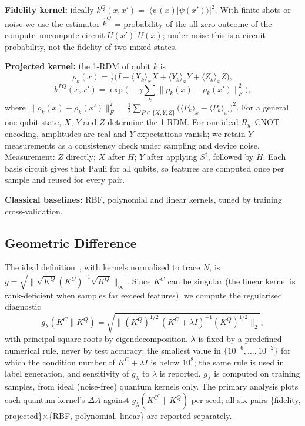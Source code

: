 \documentclass[conference]{IEEEtran}
\begin{document}
\textbf{Fidelity kernel:} ideally $k^{Q}(x,x') = |\langle \psi(x)|\psi(x')\rangle|^{2}$. With finite shots or noise we use the estimator $\hat k^{Q}$ = probability of the all-zero outcome of the compute--uncompute circuit $U(x')^\dagger U(x)$; under noise this is a circuit probability, not the fidelity of two mixed states.

\textbf{Projected kernel:} the 1-RDM of qubit $k$ is
\begin{equation}
\rho_k(x)=\tfrac{1}{2}\big(I+\langle X_k\rangle_x X+\langle Y_k\rangle_x Y+\langle Z_k\rangle_x Z\big),
\end{equation}
\begin{equation}
k^{PQ}(x,x') = \exp\!\Big(-\gamma \sum_{k}\big\|\rho_k(x)-\rho_k(x')\big\|_F^{2}\Big),
\end{equation}
where $\|\rho_k(x)-\rho_k(x')\|_F^2=\tfrac{1}{2}\sum_{P\in\{X,Y,Z\}}\big(\langle P_k\rangle_x-\langle P_k\rangle_{x'}\big)^2$. For a general one-qubit state, $X$, $Y$ and $Z$ determine the 1-RDM. For our ideal $R_y$--CNOT encoding, amplitudes are real and $Y$ expectations vanish; we retain $Y$ measurements as a consistency check under sampling and device noise. Measurement: $Z$ directly; $X$ after $H$; $Y$ after applying $S^\dagger$, followed by $H$. Each basis circuit gives that Pauli for all qubits, so features are computed once per sample and reused for every pair.

\textbf{Classical baselines:} RBF, polynomial and linear kernels, tuned by training cross-validation.

\subsection{Geometric Difference}
The ideal definition~\cite{huang2021}, with kernels normalised to trace $N$, is $g=\sqrt{\|\sqrt{K^{Q}}(K^{C})^{-1}\sqrt{K^{Q}}\|_{\infty}}$. Since $K^{C}$ can be singular (the linear kernel is rank-deficient when samples far exceed features), we compute the regularised diagnostic
\begin{equation}
g_\lambda(K^{C}\|K^{Q}) = \sqrt{\Big\|(K^{Q})^{1/2}\,(K^{C}+\lambda I)^{-1}(K^{Q})^{1/2}\Big\|_{2}},
\end{equation}
with principal square roots by eigendecomposition. $\lambda$ is fixed by a predefined numerical rule, never by test accuracy: the smallest value in $\{10^{-6},\dots,10^{-2}\}$ for which the condition number of $K^{C}+\lambda I$ is below $10^{8}$; the same rule is used in label generation, and sensitivity of $g_\lambda$ to $\lambda$ is reported. $g_\lambda$ is computed on training samples, from ideal (noise-free) quantum kernels only. The primary analysis plots each quantum kernel's $\Delta A$ against $g_\lambda(K^{C^\ast}\|K^{Q})$ per seed; all six pairs \{fidelity, projected\}$\times$\{RBF, polynomial, linear\} are reported separately.
\end{document}

